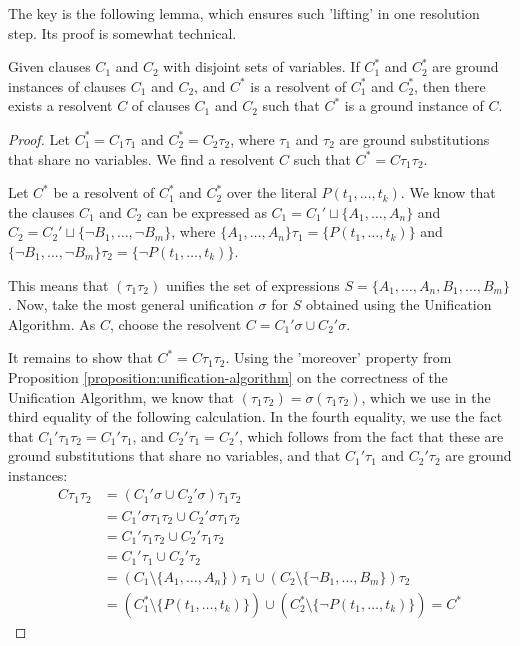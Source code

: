 The key is the following lemma, which ensures such 'lifting' in one resolution step. Its proof is somewhat technical.

\begin{lemma}\label{lemma:lifting-lemma}
Given clauses $C_1$ and $C_2$ with disjoint sets of variables. If $C^*_1$ and $C^*_2$ are ground instances of clauses $C_1$ and $C_2$, and $C^*$ is a resolvent of $C^*_1$ and $C^*_2$, then there exists a resolvent $C$ of clauses $C_1$ and $C_2$ such that $C^*$ is a ground instance of $C$.
\end{lemma}
\begin{proof}
Let $C^*_1=C_1\tau_1$ and $C^*_2=C_2\tau_2$, where $\tau_1$ and $\tau_2$ are ground substitutions that share no variables. We find a resolvent $C$ such that $C^*=C\tau_1\tau_2$.

Let $C^*$ be a resolvent of $C_1^*$ and $C_2^*$ over the literal $P(t_1,\dots,t_k)$. We know that the clauses $C_1$ and $C_2$ can be expressed as $C_1=C_1' \sqcup \{A_1,\dots,A_n\}$ and $C_2=C_2' \sqcup \{\neg B_1,\dots,\neg B_m\}$, where $\{A_1,\dots,A_n\}\tau_1=\{P(t_1,\dots,t_k)\}$ and $\{\neg B_1,\dots,\neg B_m\}\tau_2=\{\neg P(t_1,\dots,t_k)\}$.

This means that $(\tau_1\tau_2)$ unifies the set of expressions $S=\{A_1,\dots,A_n,B_1,\dots,B_m\}$. Now, take the most general unification $\sigma$ for $S$ obtained using the Unification Algorithm. As $C$, choose the resolvent $C=C_1'\sigma \cup C_2'\sigma$.

It remains to show that $C^*=C\tau_1\tau_2$. Using the 'moreover' property from Proposition \ref{proposition:unification-algorithm} on the correctness of the Unification Algorithm, we know that $(\tau_1\tau_2)=\sigma(\tau_1\tau_2)$, which we use in the third equality of the following calculation. In the fourth equality, we use the fact that $C_1'\tau_1\tau_2=C_1'\tau_1$, and $C_2'\tau_1=C_2'$, which follows from the fact that these are ground substitutions that share no variables, and that $C_1'\tau_1$ and $C_2'\tau_2$ are ground instances:
\begin{align*}
    C\tau_1\tau_2&= (C_1'\sigma \cup C_2'\sigma)\tau_1\tau_2\\
    &=C_1'\sigma\tau_1\tau_2 \cup C_2'\sigma\tau_1\tau_2\\
    &=C_1'\tau_1\tau_2 \cup C_2'\tau_1\tau_2\\
    &=C_1'\tau_1 \cup C_2'\tau_2\\
    &=(C_1\setminus\{A_1,\dots,A_n\})\tau_1\cup (C_2\setminus\{\neg B_1,\dots,B_m\})\tau_2\\
    &=(C_1^*\setminus\{P(t_1,\dots,t_k)\})\cup(C_2^*\setminus \{\neg P(t_1,\dots,t_k)\})=C^*
\end{align*}
\end{proof}

